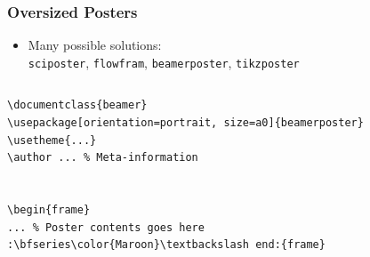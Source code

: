 \begin{frame}[fragile]
\frametitle{Oversized Posters}
\begin{itemize}
\item Many possible solutions:\\\texttt{sciposter}, \texttt{flowfram}, \texttt{beamerposter}, \texttt{tikzposter}
\end{itemize}

\begin{columns}
\begin{column}{.5\textwidth}
\begin{beamerboxesrounded}[width=\linewidth]{}
\begin{lstlisting}[basicstyle=\ttfamily\small,
moretexcs={usetheme,frametitle,frame},
emph={beamer,beamerposter,frame},
escapechar={:},lineskip=-2pt]
\documentclass{beamer}
\usepackage[orientation=portrait, size=a0]{beamerposter}
\usetheme{...}
\author ... % Meta-information


\begin{frame}
... % Poster contents goes here
:\bfseries\color{Maroon}\textbackslash end:{frame}

\end{lstlisting}
\end{beamerboxesrounded}
\end{column}
\begin{column}{.48\textwidth}
\centering
\end{column}
\end{columns}

\end{frame}

